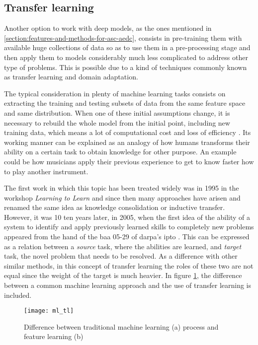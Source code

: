 \subsection{Transfer learning}
\label{subsection:transfer-learning}

	Another option to work with deep models, as the ones mentioned in \ref{section:features-and-methods-for-asc-aedc}, consists in pre-training them with available huge collections of data so as to use them in a pre-processing stage and then apply them to models considerably much less complicated to address other type of problems. This is possible due to a kind of techniques commonly known as transfer learning and domain adaptation.
	
	The typical consideration in plenty of machine learning tasks consists on extracting the training and testing subsets of data from the same feature space and same distribution. When one of these initial assumptions change, it is necessary to rebuild the whole model from the initial point, including new training data, which means a lot of computational cost and loss of efficiency \cite{Pan2010}. Its working manner can be explained as an analogy of how humans transforms their ability on a certain task to obtain knowledge for other purpose. An example could be how musicians apply their previous experience to get to know faster how to play another instrument.
	
	The first work in which this topic has been treated widely was in 1995 in the workshop \textit{Learning to Learn} \cite{Sarkar2018} and since then many approaches have arisen and renamed the same idea as knowledge consolidation or inductive transfer. However, it was 10 ten years later, in 2005, when the first idea of the ability of a system to identify and apply previously learned skills to completely new problems appeared from the hand of the \acrfull{baa} 05-29 of \acrfull{darpa}’s \acrfull{ipto} \cite{Pan2010}. This can be expressed as a relation between a \textit{source} task, where the abilities are learned, and \textit{target} task, the novel problem that needs to be resolved. As a difference with other similar methods, in this concept of transfer learning the roles of these two are not equal since the weight of the target is much heavier. In figure \ref{fig:mesh4}, the difference between a common machine learning approach and the use of transfer learning is included.
	
	\begin{figure}[h]
		\centering
		\captionsetup{justification=centering}
		\texttt{[image: ml\_tl]}
		\caption{Difference between traditional machine learning (a) process and feature learning (b) \cite{Pan2010}}
		\label{fig:mesh4}
	\end{figure}
	
